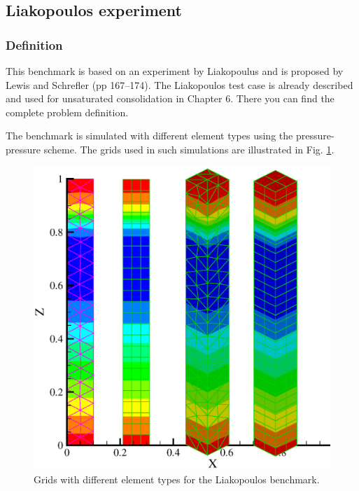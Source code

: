 \subsection{Liakopoulos experiment}

\subsubsection*{Definition}
This benchmark is based on an experiment by Liakopoulus \cite{Lia:65} and is proposed by Lewis and Schrefler \cite{LewSch:98}(pp 167--174). The Liakopoulos test case is already described and used for unsaturated consolidation in Chapter 6. There you can find the complete problem definition.

The benchmark is simulated with different element types using the pressure-pressure scheme. The grids used in such simulations are illustrated in Fig. \ref{liak:grids}.

\begin{figure}[!tbh]
\begin{center}
\includegraphics[scale=0.35]{chapter_13/figures/fig_13_1_1}
\end{center}
\caption{Grids with different element types for the Liakopoulos benchmark.}
\label{liak:grids}
\end{figure}

